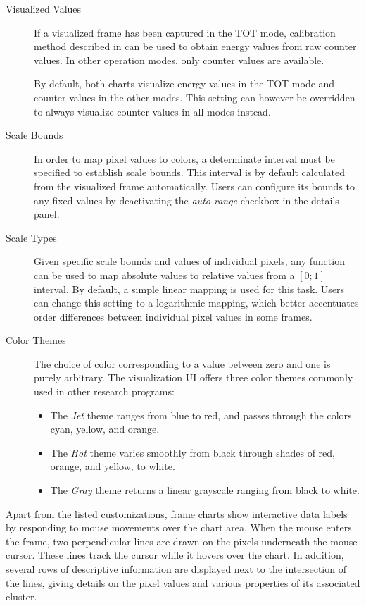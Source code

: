 \begin{description}
	\item[Visualized Values]
	If a visualized frame has been captured in the TOT mode, calibration method described in \cite{EnergyCalibration} can be used to obtain energy values from raw counter values. In other operation modes, only counter values are available.

	By default, both charts visualize energy values in the TOT mode and counter values in the other modes. This setting can however be overridden to always visualize counter values in all modes instead.

	\item[Scale Bounds]
	In order to map pixel values to colors, a determinate interval must be specified to establish scale bounds. This interval is by default calculated from the visualized frame automatically. Users can configure its bounds to any fixed values by deactivating the \textit{auto range} checkbox in the details panel.

	\item[Scale Types]
	Given specific scale bounds and values of individual pixels, any function can be used to map absolute values to relative values from a $[0;1]$ interval. By default, a simple linear mapping is used for this task. Users can change this setting to a logarithmic mapping, which better accentuates order differences between individual pixel values in some frames.

	\item[Color Themes]
	The choice of color corresponding to a value between zero and one is purely arbitrary. The visualization UI offers three color themes commonly used in other research programs:

	\begin{itemize}
		\item The \textit{Jet} theme ranges from blue to red, and passes through the colors cyan, yellow, and orange.
		\item The \textit{Hot} theme varies smoothly from black through shades of red, orange, and yellow, to white.
		\item The \textit{Gray} theme returns a linear grayscale ranging from black to white.
	\end{itemize}
\end{description}

Apart from the listed customizations, frame charts show interactive data labels by responding to mouse movements over the chart area. When the mouse enters the frame, two perpendicular lines are drawn on the pixels underneath the mouse cursor. These lines track the cursor while it hovers over the chart. In addition, several rows of descriptive information are displayed next to the intersection of the lines, giving details on the pixel values and various properties of its associated cluster.

